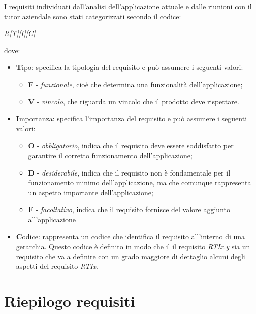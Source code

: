 I requisiti individuati dall'analisi dell'applicazione attuale e dalle riunioni con il tutor aziendale sono stati categorizzati secondo il codice:
\begin{center}
\textit{R[T][I][C]}
\end{center}
dove:
\begin{itemize}
\item \textbf{T}ipo: specifica la tipologia del requisito e può assumere i seguenti valori:
	\begin{itemize}
	\item \textbf{F} - \textit{funzionale}, cioè che determina una funzionalità dell'applicazione;
	\item \textbf{V} - \textit{vincolo}, che riguarda un vincolo che il prodotto deve rispettare.
	\end{itemize}
\item \textbf{I}mportanza: specifica l'importanza del requisito e può assumere i seguenti valori:
	\begin{itemize}
	\item \textbf{O} - \textit{obbligatorio}, indica che il requisito deve essere soddisfatto per garantire il corretto funzionamento dell'applicazione;
	\item \textbf{D} - \textit{desiderabile}, indica che il requisito non è fondamentale per il funzionamento minimo dell'applicazione, ma che comunque rappresenta un aspetto importante dell'applicazione;
	\item \textbf{F} - \textit{facoltativo}, indica che il requisito fornisce del valore aggiunto all'applicazione
	\end{itemize}
\item \textbf{C}odice: rappresenta un codice che identifica il requisito all'interno di una gerarchia. Questo codice è definito in modo che il il requisito \textit{RTIx.y} sia un requisito che va a definire con un grado maggiore di dettaglio alcuni degli aspetti del requisito \textit{RTIx}.
\end{itemize}




\section{Riepilogo requisiti}

